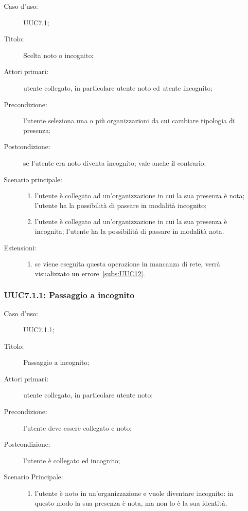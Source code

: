 \documentclass[../../../analisi-dei-requisiti.tex]{subfiles}
\begin{document}
\begin{description}
  \item[Caso d’uso:] UUC7.1;
  \item[Titolo:] Scelta noto o incognito;
  \item[Attori primari:] utente collegato, in particolare utente noto ed utente incognito;
  \item[Precondizione:] l'utente seleziona una o più organizzazioni da cui cambiare tipologia di presenza;
  \item[Postcondizione:] se l'utente era noto diventa incognito; vale anche il contrario;
  \item[Scenario principale:]
        \begin{enumerate}
          \item l'utente è collegato ad un'organizzazione in cui la sua presenza è nota; l'utente ha la possibilità di passare in modalità incognito;
          \item l'utente è collegato ad un'organizzazione in cui la sua presenza è incognita; l'utente ha la possibilità di passare in modalità nota.
        \end{enumerate}
  \item[Estensioni:]
        \begin{enumerate}
          \item se viene eseguita questa operazione in mancanza di rete, verrà visualizzato un errore~\ref{subs:UUC12}.
        \end{enumerate}
\end{description}

\subsubsection{UUC7.1.1: Passaggio a incognito}%
\label{subs:UUC7.1.1}
\begin{description}
  \item[Caso d’uso:] UUC7.1.1;
  \item[Titolo:] Passaggio a incognito;
  \item[Attori primari:] utente collegato, in particolare utente noto;
  \item[Precondizione:] l'utente deve essere collegato e noto;
  \item[Postcondizione:] l'utente è collegato ed incognito;
  \item[Scenario Principale:]
        \begin{enumerate}
          \item l'utente è noto in un'organizzazione e vuole diventare incognito: in questo modo la sua presenza è nota, ma non lo è la sua identità.
        \end{enumerate}
\end{description}
\end{document}
